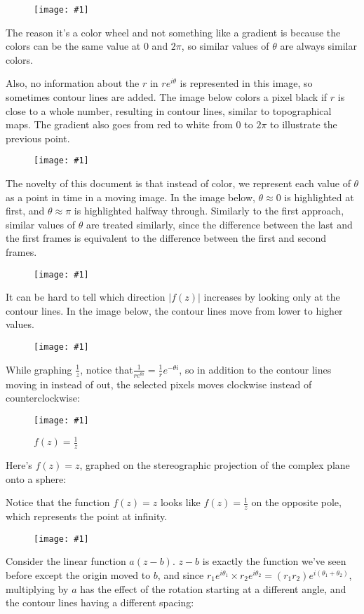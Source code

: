 \documentclass[xhtml, mathjax]{article}
\newcommand{\singleimage}[2] {
  \begin{figure}
    \centering
    \texttt{[image: \#1]}\par
    #2
  \end{figure}
}
\begin{document}
    \singleimage{z_color.gif}{}

    The reason it's a color wheel and not something like a gradient is because
    the colors can be the same value at $0$ and $2\pi$, so similar values of
    $\theta$ are always similar colors.

    Also, no information about the $r$ in $re^{i\theta}$ is represented in this
    image, so sometimes contour lines are added. The image below colors a pixel
    black if $r$ is close to a whole number, resulting in contour lines,
    similar to topographical maps. The gradient also goes from red to white from
    $0$ to $2\pi$ to illustrate the previous point.

    \singleimage{z_contour_gradient.gif}{}

    The novelty of this document is that instead of color, we represent each
    value of $\theta$ as a point in time in a moving image. In the image below,
    $\theta \approx 0$ is highlighted at first, and $\theta \approx \pi$ is
    highlighted halfway through. Similarly to the first approach, similar values
    of $\theta$ are treated similarly, since the difference between the last and
    the first frames is equivalent to the difference between the first and
    second frames.

    \singleimage{z_loop.gif}{}

    It can be hard to tell which direction $|f(z)|$ increases by looking only at
    the contour lines. In the image below, the contour lines move from lower to
    higher values.

    \singleimage{z_contour_loop.gif}{}

    While graphing $\frac{1}{z}$, notice that$\frac{1}{re^{\theta i}} =
    \frac{1}{r}e^{-\theta i}$, so in addition to the contour lines moving in
    instead of out, the selected pixels moves clockwise instead of
    counterclockwise:

    \singleimage{inv.gif}{$f(z) = \frac{1}{z}$}

    Here's $f(z) = z$, graphed on the stereographic projection of the complex
    plane onto a sphere:

    Notice that the function $f(z) = z$ looks like $f(z) = \frac{1}{z}$ on the
    opposite pole, which represents the point at infinity.

    \singleimage{z_sphere.gif}{}

    Consider the linear function $a(z-b)$. $z-b$ is exactly the function we've
    seen before except the origin moved to $b$, and since $r_1e^{i\theta_1}
    \times r_2e^{i\theta_2} = (r_1 r_2) e^{i(\theta_1 + \theta_2)}$, multiplying
    by $a$ has the effect of the rotation starting at a different angle, and the
    contour lines having a different spacing:
\end{document}
